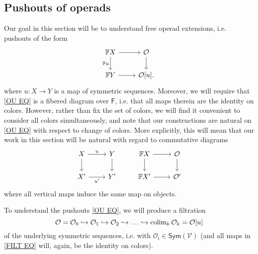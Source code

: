 \documentclass[a4paper,10pt
,draft
]{article}%
\renewcommand{\1}{\eta}%
\begin{document}





\subsection{Pushouts of operads}
\label{PUSHOUT_SEC}


Our goal in this section will be to understand free operad extensions, i.e. pushouts of the form 
\begin{equation}\label{OU EQ}
            \begin{tikzcd}
                  \mathbb F X \arrow[d, "\mathbb{F}u"'] \arrow[r]
                  &
                  \O \arrow[d]
                  \\
                  \mathbb F Y \arrow[r]
                  &
                  \O[u].
            \end{tikzcd}
\end{equation}
where $u \colon X \to Y$ is a map of symmetric sequences.
Moreover, we will require that \eqref{OU EQ} is a fibered diagram over $\mathsf{F}$, i.e. that all maps therein are the identity on colors.
However, rather than fix the set of colors, 
we will find it convenient to consider all colors simultaneously, 
and note that our constructions are natural 
on \eqref{OU EQ} with respect to change of colors.
More explicitly, this will mean that our work in this section will be natural with regard to commutative diagrams
\begin{equation}\label{COLORCHNAT EQ}
	\begin{tikzcd}
		X \arrow[r, "u"',swap] \arrow[d]
	&
		Y \arrow[d]
&
		\mathbb F X \arrow[d] \arrow[r]
	&
		\O \arrow[d]
\\
		X' \arrow[r, "u'"']
	&
		Y'
&
		\mathbb F X' \arrow[r]
	&
		\O'
	\end{tikzcd}
\end{equation}
where all vertical maps induce the same map on objects.


To understand the pushouts \eqref{OU EQ},
we will produce a filtration
\begin{equation}\label{FILT EQ}
      \O = \O_0 \into \O_1 \into \O_2 \into \dots \into \colim_k \O_k = \O[u]
\end{equation}
of the underlying symmetric sequences, i.e. with 
$\mathcal{O}_i \in \mathsf{Sym}(\mathcal{V})$
(and all maps in \eqref{FILT EQ} will, again, be the identity on colors).
\end{document}
